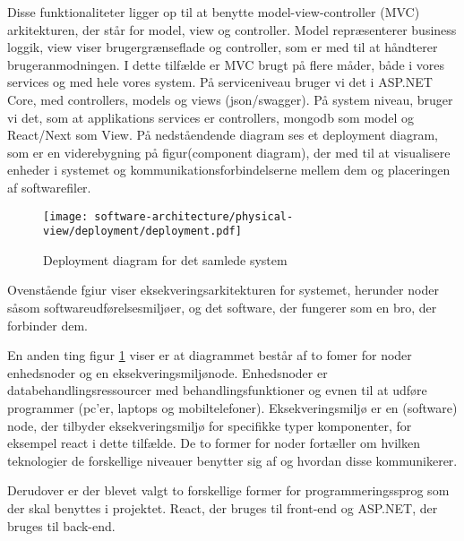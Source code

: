Disse funktionaliteter ligger op til at benytte model-view-controller (MVC) arkitekturen, der står for model, view og controller. Model repræsenterer business loggik, view viser brugergrænseflade og controller, som er med til at håndterer brugeranmodningen. I dette tilfælde er MVC brugt på flere måder, både i vores services og med hele vores system. På serviceniveau bruger vi det i ASP.NET Core, med controllers, models og views (json/swagger). På system niveau, bruger vi det, som at applikations services er controllers, mongodb som model og React/Next som View.
\newpage
På nedståendende diagram ses et deployment diagram, som er en viderebygning på figur(component diagram), der med til at visualisere enheder i systemet og kommunikationsforbindelserne mellem dem og placeringen af softwarefiler.


\begin{figure}[H]
    \centering
\texttt{[image: software-architecture/physical-view/deployment/deployment.pdf]}
\caption{Deployment diagram for det samlede system}
\label{fig:deploymentdiagram}
\end{figure}

Ovenstående fgiur viser eksekveringsarkitekturen for systemet, herunder noder såsom softwareudførelsesmiljøer, og det software, der fungerer som en bro, der forbinder dem. 

En anden ting figur \ref{fig:deploymentdiagram} viser er at diagrammet består af to fomer for noder enhedsnoder og en eksekveringsmiljønode. Enhedsnoder er databehandlingsressourcer med behandlingsfunktioner og evnen til at udføre programmer (pc'er, laptops og mobiltelefoner).  Eksekveringsmiljø er en (software) node, der tilbyder eksekveringsmiljø for specifikke typer komponenter, for eksempel react i dette tilfælde. De to former for noder fortæller om hvilken teknologier de forskellige niveauer benytter sig af og hvordan disse kommunikerer.

Derudover er der blevet valgt to forskellige former for programmeringssprog som der skal benyttes i projektet. React, der bruges til front-end og ASP.NET, der bruges til back-end. 




